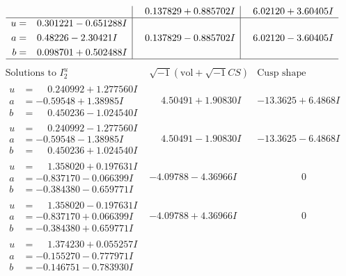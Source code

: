 \documentclass[1p]{elsarticle_modified}
\theoremstyle{definition}
\newcommand{\I}{\sqrt{-1}}
\begin{document}
$$\begin{array}{c|c|c}
 & \phantom{-}0.137829 + 0.885702 I & \phantom{-}6.02120 + 3.60405 I \\ \hline\begin{aligned}
u &= \phantom{-}0.301221 - 0.651288 I \\
a &= \phantom{-}0.48226 - 2.30421 I \\
b &= \phantom{-}0.098701 + 0.502488 I\end{aligned}
 & \phantom{-}0.137829 - 0.885702 I & \phantom{-}6.02120 - 3.60405 I\\
 \hline 
 \end{array}$$\newpage$$\begin{array}{c|c|c}  
\text{Solutions to }I^u_{2}& \I (\text{vol} + \sqrt{-1}CS) & \text{Cusp shape}\\
 \hline 
\begin{aligned}
u &= \phantom{-}0.240992 + 1.277560 I \\
a &= -0.59548 + 1.38985 I \\
b &= \phantom{-}0.450236 - 1.024540 I\end{aligned}
 & \phantom{-}4.50491 + 1.90830 I & -13.3625 + 6.4868 I \\ \hline\begin{aligned}
u &= \phantom{-}0.240992 - 1.277560 I \\
a &= -0.59548 - 1.38985 I \\
b &= \phantom{-}0.450236 + 1.024540 I\end{aligned}
 & \phantom{-}4.50491 - 1.90830 I & -13.3625 - 6.4868 I \\ \hline\begin{aligned}
u &= \phantom{-}1.358020 + 0.197631 I \\
a &= -0.837170 - 0.066399 I \\
b &= -0.384380 - 0.659771 I\end{aligned}
 & -4.09788 - 4.36966 I & \phantom{-0.000000 } 0 \\ \hline\begin{aligned}
u &= \phantom{-}1.358020 - 0.197631 I \\
a &= -0.837170 + 0.066399 I \\
b &= -0.384380 + 0.659771 I\end{aligned}
 & -4.09788 + 4.36966 I & \phantom{-0.000000 } 0 \\ \hline\begin{aligned}
u &= \phantom{-}1.374230 + 0.055257 I \\
a &= -0.155270 - 0.777971 I \\
b &= -0.146751 - 0.783930 I\end{aligned}

\end{array}$$
\end{document}
